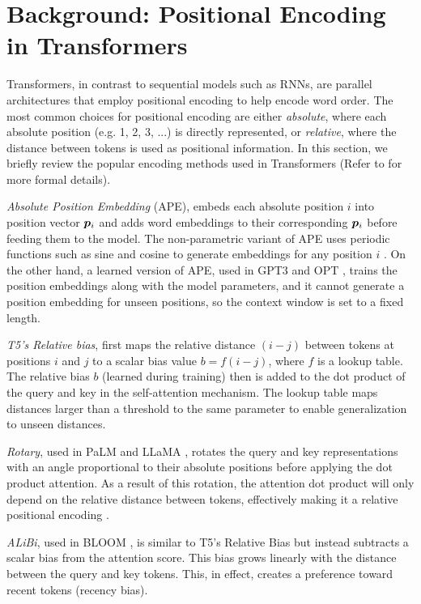 \documentclass{article}
\begin{document}
\section{Background: Positional Encoding in Transformers}

Transformers, in contrast to sequential models such as RNNs, are parallel architectures that employ positional encoding to help encode word order.
The most common choices for positional encoding are either \emph{absolute},
where each absolute position (e.g. 1, 2, 3, ...) is directly represented, or \emph{relative},
where the distance between tokens is used as positional information.
In this section, we briefly review the popular encoding methods used in Transformers (Refer to  for more formal details).

\emph{Absolute Position Embedding} (APE), embeds each absolute position $i$ into position vector ${\bm{p}}_i$ and adds word embeddings to their corresponding ${\bm{p}}_i$ before feeding them to the model.
The non-parametric variant of APE uses periodic functions such as sine and cosine to generate embeddings for any position $i$ \citep{Vaswani2017:Transformer}. On the other hand, a learned version of APE, used in GPT3 \citep{Brown2020:GPT3} and OPT \citep{Zhang2022:OPT}, trains the position embeddings along with the model parameters, and it cannot generate a position embedding for unseen positions, so the context window is set to a fixed length.

\emph{T5's Relative bias}, first maps the relative distance $(i-j)$ between tokens at positions $i$ and $j$ to a scalar bias value $b = f(i-j)$, where $f$ is a lookup table.
The relative bias $b$ (learned during training) then is added to the dot product of the query and key in the self-attention mechanism. The lookup table maps distances larger than a threshold to the same parameter to enable generalization to unseen distances.

\emph{Rotary}, used in PaLM \citep{Chowdhery2022:PaLM} and LLaMA \citep{Touvron2023:LLaMA}, rotates the query and key representations with an angle proportional to their absolute positions before applying the dot product attention. As a result of this rotation, the attention dot product will only depend on the relative distance between tokens, effectively making it a relative positional encoding \citep{Su2021:Rotary}.

\emph{ALiBi}, used in BLOOM \citep{Scao2022:BLOOM}, is similar to T5's Relative Bias but instead subtracts a scalar bias from the attention score. This bias grows linearly with the distance between the query and key tokens. This, in effect, creates a preference toward recent tokens (recency bias).
\end{document}
